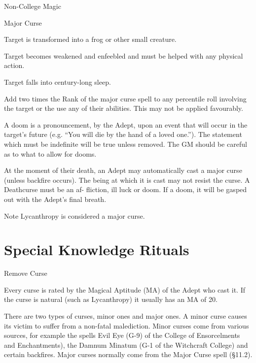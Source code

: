 \begin{Chapter}{Non-College Magic}
\begin{ritual}{Major Curse}
\begin{effects}
\begin{Enumerate}
\item Target is transformed into a frog or other small creature.

\item Target  becomes  weakened  and  enfeebled  and 
must be helped with any physical action. 

\item Target falls into century-long sleep. 
\end{Enumerate}

\begin{Description}
\item[Ill Luck] Add two times the Rank of the major curse spell to any
  percentile roll involving the target or the use any of their
  abilities. This may not be applied favourably.

\item[Doom] A doom is a pronouncement, by the Adept, upon an event
  that will occur in the target’s future (e.g.  “You will die by the
  hand of a loved one.”).  The statement which must be indefinite will
  be true unless removed.  The GM should be careful as to what to
  allow for dooms.

\item[Death-curse] At the moment of their death, an Adept may
  automatically cast a major curse (unless backfire occurs).  The
  being at which it is cast may not resist the curse.  A Deathcurse
  must be an af- fliction, ill luck or doom.  If a doom, it will be
  gasped out with the Adept’s final breath.
\end{Description}
Note Lycanthropy is considered a major curse.
\end{effects}
\end{ritual}


\section{Special Knowledge Rituals}


\begin{ritual}{Remove Curse}

\begin{effects}
Every curse is rated by the Magical Aptitude (MA) of the Adept who
cast it. If the curse is natural (such as Lycanthropy) it usually has
an MA of 20.

There are two types of curses, minor ones and major ones.  A minor
curse causes its victim to suffer from a non-fatal malediction.  Minor
curses come from various sources, for example the spells Evil Eye (G-9)
of the College of Ensorcelments and Enchantments), the Damnum Minatum
(G-1 of the Witchcraft College) and certain backfires.  Major curses
normally come from the Major Curse spell (§11.2).


\end{effects}
\end{ritual}
\end{Chapter}
